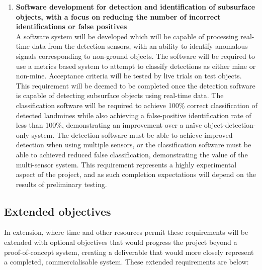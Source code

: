 \documentclass[main.tex]{subfiles}
\begin{document}
\begin{enumerate}
\item \textbf{Software development for detection and identification of subsurface objects, with a focus on reducing the number of incorrect identifications or false positives}\\ 
A software system will be developed which will be capable of processing real-time data from the detection sensors, with an ability to identify anomalous signals corresponding to non-ground objects. 
The software will be required to use a metrics based system to attempt to classify detections as either mine or non-mine. 
Acceptance criteria will be tested by live trials on test objects. 
This requirement will be deemed to be completed once the detection software is capable of detecting subsurface objects using real-time data. 
The classification software will be required to achieve 100\% correct classification of detected landmines while also achieving a false-positive identification rate of less than 100\%, demonstrating an improvement over a naïve object-detection-only system. 
The detection software must be able to achieve improved detection when using multiple sensors, or the classification software must be able to achieved reduced false classification, demonstrating the value of the multi-sensor system. 
This requirement represents a highly experimental aspect of the project, and as such completion expectations will depend on the results of preliminary testing. 
\end{enumerate}

\subsection{Extended objectives}
In extension, where time and other resources permit these requirements will be extended with optional objectives that would progress the project beyond a proof-of-concept system, creating a deliverable that would more closely represent a completed, commercialisable system. 
These extended requirements are below:
\end{document}
